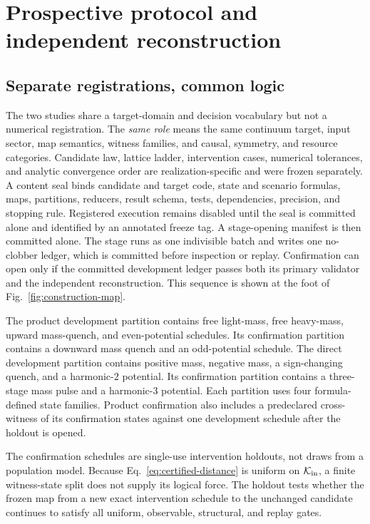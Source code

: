 \section{Prospective protocol and independent reconstruction}
\label{sec:protocol}

\subsection{Separate registrations, common logic}

The two studies share a target-domain and decision vocabulary but not a
numerical registration.  The \emph{same role} means the same continuum target,
input sector, map semantics, witness families, and causal, symmetry, and
resource categories.  Candidate law, lattice ladder, intervention cases,
numerical tolerances, and analytic convergence order are
realization-specific and were frozen separately.  A content seal binds
candidate and target code, state and scenario formulas,
maps, partitions, reducers, result schema, tests, dependencies, precision, and
stopping rule.  Registered execution remains disabled until the seal is
committed alone and identified by an annotated freeze tag.  A stage-opening
manifest is then committed alone.  The stage runs as one indivisible batch and
writes one no-clobber ledger, which is committed before inspection or replay.
Confirmation can open only if the committed development ledger passes both
its primary validator and the independent reconstruction.  This sequence is
shown at the foot of Fig.~\ref{fig:construction-map}.

The product development partition contains free light-mass, free heavy-mass,
upward mass-quench, and even-potential schedules.  Its confirmation partition
contains a downward mass quench and an odd-potential schedule.  The direct
development partition contains positive mass, negative mass, a sign-changing
quench, and a harmonic-$2$ potential.  Its confirmation partition contains a
three-stage mass pulse and a harmonic-$3$ potential.  Each partition uses four
formula-defined state families.  Product confirmation also includes a
predeclared cross-witness of its confirmation states against one development
schedule after the holdout is opened.

The confirmation schedules are single-use intervention holdouts, not draws
from a population model.  Because Eq.~\eqref{eq:certified-distance} is uniform
on $\mathcal{K}_{\mathrm{in}}$, a finite witness-state split does not supply its logical force.  The
holdout tests whether the frozen map from a new exact intervention schedule to
the unchanged candidate continues to satisfy all uniform, observable,
structural, and replay gates.

